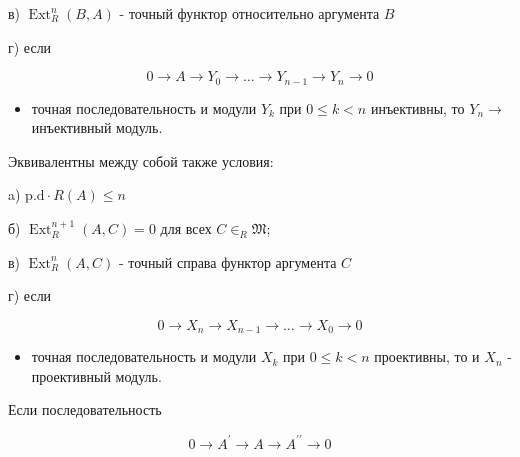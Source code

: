 \documentclass[10pt]{article}
\begin{document}
в) $\operatorname{Ext}_{R}^{n}(B, A)$ - точный функтор относительно аргумента $B$



г) если



\[

0 \longrightarrow A \longrightarrow Y_{0} \longrightarrow \ldots \longrightarrow Y_{n-1} \longrightarrow Y_{n} \longrightarrow 0

\]



\begin{itemize}

  \item точная последовательность и модули $Y_{k}$ при $0 \leqslant k<n$ инъективны, то $Y_{n} \rightarrow$ инъективный модуль.

\end{itemize}



Эквивалентны между собой также условия:



a) $\mathrm{p} . \mathrm{d} \cdot R(A) \leqslant n$



б) $\operatorname{Ext}_{R}^{n+1}(A, C)=0$ для всех $C \in_{R} \mathfrak{M}$;



в) $\operatorname{Ext}_{R}^{n}(A, C)$ - точный справа функтор аргумента $C$



г) если



\[

0 \longrightarrow X_{n} \longrightarrow X_{n-1} \longrightarrow \ldots \longrightarrow X_{0} \longrightarrow 0

\]



\begin{itemize}

  \item точная последовательность и модули $X_{k}$ при $0 \leqslant k<n$ проективны, то и $X_{n}$ - проективный модуль.

\end{itemize}



Если последовательность



\[

0 \longrightarrow A^{\prime} \longrightarrow A \longrightarrow A^{\prime \prime} \longrightarrow 0

\]
\end{document}
